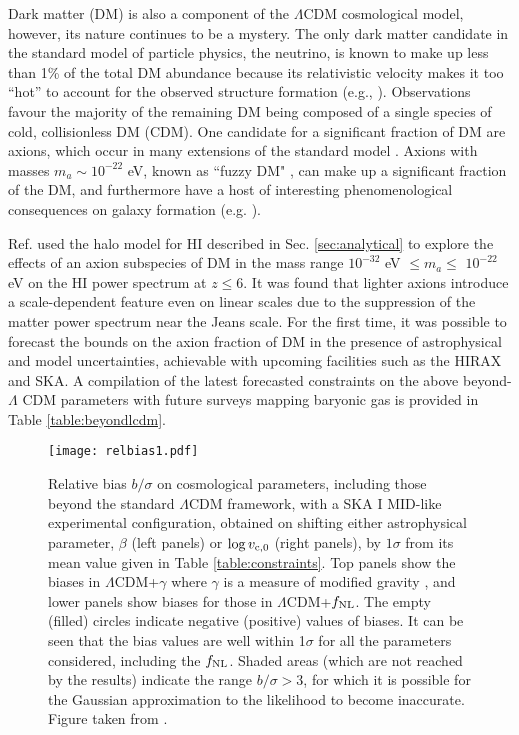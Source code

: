 Dark matter (DM) is also a component of the $\Lambda$CDM cosmological model, however, its nature continues to be a mystery. The only dark matter candidate in the standard model of particle physics, the neutrino, is known to make up less than 1\% of the total DM abundance because its relativistic velocity makes it too “hot” to account for the observed structure formation (e.g., \cite{Alam:2016hwk}). Observations  favour the majority of the remaining DM being composed of a single species of cold, collisionless DM (CDM). One candidate for a significant fraction of DM are axions, which occur in  many extensions of the standard model \cite{PecceiQuinn1977, Weinberg1978}. Axions with masses $m_a \sim 10^{-22}$ eV, known as ``fuzzy DM" \cite{Hu:2000ax}, can make up a significant fraction of the DM, and furthermore have a host of interesting phenomenological consequences on galaxy formation (e.g. \cite{Arvanitaki_2010, Marsh_review2016, Niemeyer:2019aqm}). 

Ref. \cite{bauer2021} used the halo model for HI described in Sec. \ref{sec:analytical} to explore the effects of an axion subspecies of DM in the mass range $10^{-32}$ eV $\leq m_a \leq$ $10^{-22}$ eV on the HI power spectrum at $z \leq 6$. It was found that lighter axions introduce a scale-dependent feature even on linear scales due to the suppression of the matter power spectrum near the Jeans scale. For the first time, it was possible to forecast the bounds on the axion fraction of DM in the presence of astrophysical and model uncertainties, achievable with upcoming facilities such as the HIRAX and SKA. A compilation of the latest forecasted constraints on the above beyond-$\Lambda$ CDM parameters with future surveys mapping baryonic gas is provided in Table \ref{table:beyondlcdm}.
\begin{figure}
\centering
\texttt{[image: relbias1.pdf]}
\caption{Relative bias $b/\sigma$ on cosmological parameters, including those beyond the standard $\Lambda$CDM 
framework,  with a SKA I MID-like experimental configuration, obtained on shifting either 
astrophysical parameter, $\beta$ (left panels) or $\log v_{\rm c,0}$ (right panels), 
by $1 \sigma$ from its mean value given in Table \ref{table:constraints}. Top panels show the biases in
$\Lambda$CDM+$\gamma$ where $\gamma$ is a measure of modified gravity \cite{camera2020}, and lower panels show biases for those in $\Lambda$CDM+$f_{\rm NL}$. The empty 
(filled) circles indicate negative (positive) values of  biases. It can be seen that the bias values are well within 1$\sigma$ for all the parameters considered, including the $f_{\rm NL}$. Shaded areas (which are not reached by the results) indicate the range $b/\sigma > 3$, for which it is possible for the Gaussian approximation to the likelihood to become inaccurate. Figure taken from \cite{camera2020}. }
\label{fig:relbias1}
\end{figure}

